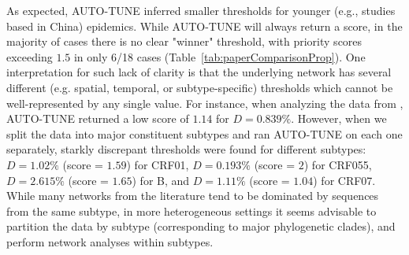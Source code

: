 \documentclass[utf8]{FrontiersinHarvard} %
\begin{document}
As expected, AUTO-TUNE inferred smaller thresholds for younger (e.g., studies
based in China) epidemics. While AUTO-TUNE will always return a score, in the
majority of cases there is no clear "winner" threshold, with priority scores
exceeding $1.5$ in only 6/18 cases (Table~\ref{tab:paperComparisonProp}). One
interpretation for such lack of clarity is that the underlying network has
several different (e.g. spatial, temporal, or subtype-specific) thresholds
which cannot be well-represented by any single value.  For instance, when
analyzing the data from \citet{Yan:2021aa}, AUTO-TUNE returned a low score of
$1.14$ for $D=0.839\%$. However, when we split the  data into major constituent
subtypes and ran AUTO-TUNE on each one separately, starkly discrepant
thresholds were found for different subtypes: $D=1.02\%$ (score = $1.59$) for
CRF01,   $D=0.193\%$ (score = $2$) for CRF055,  $D=2.615\%$ (score = $1.65$)
for B,  and $D=1.11\%$ (score = $1.04$) for CRF07. While many networks from the
literature tend to be dominated by sequences from the same subtype, in more
heterogeneous settings it seems advisable to partition the data by subtype
(corresponding to major phylogenetic clades), and perform network analyses
within subtypes. 
\end{document}
